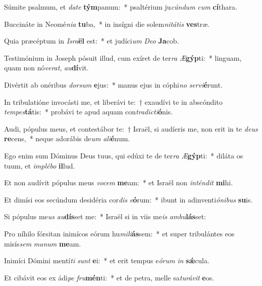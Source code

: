 \item Súmite psalmum, et \textit{da}\textit{te} \textbf{tým}panum:~* psaltérium ju\textit{cún}\textit{dum} \textit{cum} \textbf{cí}thara.
\item Buccináte in Neomé\textit{ni}\textit{a} \textbf{tu}ba,~* in insígni die solem\textit{ni}\textit{tá}\textit{tis} \textbf{ves}træ.
\item Quia præcéptum in \textit{Is}\textit{ra}\textbf{ël} est:~* et judíci\textit{um} \textit{De}\textit{o} \textbf{Ja}cob.
\item Testimónium in Joseph pósuit illud, cum exíret de ter\textit{ra} \textit{Æ}\textbf{gýp}ti:~* linguam, quam non nó\textit{ve}\textit{rat}, \textit{au}\textbf{dí}vit.
\item Divértit ab onéribus \textit{dor}\textit{sum} \textbf{e}jus:~* manus ejus in cóphi\textit{no} \textit{ser}\textit{vi}\textbf{é}runt.
\item In tribulatióne invocásti me, et liberávi te:~† exaudívi te in abscóndito \textit{tem}\textit{pes}\textbf{tá}tis:~* probávi te apud aquam con\textit{tra}\textit{dic}\textit{ti}\textbf{ó}nis.
\item Audi, pópulus meus, et contestábor te:~† Israël, si audíeris me, non erit in te \textit{de}\textit{us} \textbf{re}cens,~* neque adorábis de\textit{um} \textit{a}\textit{li}\textbf{é}num.
\item Ego enim sum Dóminus Deus tuus, qui edúxi te de ter\textit{ra} \textit{Æ}\textbf{gýp}ti:~* diláta os tuum, et \textit{im}\textit{plé}\textit{bo} \textbf{il}lud.
\item Et non audívit pópulus meus \textit{vo}\textit{cem} \textbf{me}am:~* et Israël non \textit{in}\textit{tén}\textit{dit} \textbf{mi}hi.
\item Et dimísi eos secúndum desidéria cor\textit{dis} \textit{e}\textbf{ó}rum:~* ibunt in adinventi\textit{ó}\textit{ni}\textit{bus} \textbf{su}is.
\item Si pópulus me\textit{us} \textit{au}\textbf{dís}set me:~* Israël si in viis me\textit{is} \textit{am}\textit{bu}\textbf{lás}set:
\item Pro níhilo fórsitan inimícos eórum hu\textit{mi}\textit{li}\textbf{ás}sem:~* et super tribulántes eos misís\textit{sem} \textit{ma}\textit{num} \textbf{me}am.
\item Inimíci Dómini mentí\textit{ti} \textit{sunt} \textbf{e}i:~* et erit tempus e\textit{ó}\textit{rum} \textit{in} \textbf{sǽ}cula.
\item Et cibávit eos ex ádi\textit{pe} \textit{fru}\textbf{mén}ti:~* et de petra, melle sa\textit{tu}\textit{rá}\textit{vit} \textbf{e}os.
